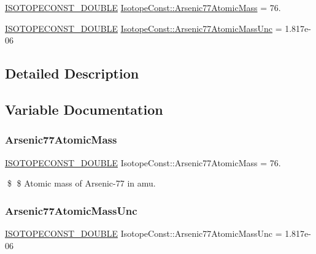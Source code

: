 \begin{DoxyCompactItemize}
\item 
\mbox{\hyperlink{group___isotope_const-_macros_ga8f45a7272ce02c0b4c65c44636ed719a}{I\+S\+O\+T\+O\+P\+E\+C\+O\+N\+S\+T\+\_\+\+D\+O\+U\+B\+LE}} \mbox{\hyperlink{group___isotope_const-_arsenic-_as77_ga30bb4168897cb4e903882e5d24861c7c}{Isotope\+Const\+::\+Arsenic77\+Atomic\+Mass}} = 76.
\item 
\mbox{\hyperlink{group___isotope_const-_macros_ga8f45a7272ce02c0b4c65c44636ed719a}{I\+S\+O\+T\+O\+P\+E\+C\+O\+N\+S\+T\+\_\+\+D\+O\+U\+B\+LE}} \mbox{\hyperlink{group___isotope_const-_arsenic-_as77_ga2c2886e88f5d90d0d79398e41da9450a}{Isotope\+Const\+::\+Arsenic77\+Atomic\+Mass\+Unc}} = 1.\+817e-\/06
\end{DoxyCompactItemize}


\subsection{Detailed Description}


\subsection{Variable Documentation}
\mbox{\label{group___isotope_const-_arsenic-_as77_ga30bb4168897cb4e903882e5d24861c7c}} 
\subsubsection{\texorpdfstring{Arsenic77\+Atomic\+Mass}{Arsenic77AtomicMass}}
{\footnotesize\ttfamily \mbox{\hyperlink{group___isotope_const-_macros_ga8f45a7272ce02c0b4c65c44636ed719a}{I\+S\+O\+T\+O\+P\+E\+C\+O\+N\+S\+T\+\_\+\+D\+O\+U\+B\+LE}} Isotope\+Const\+::\+Arsenic77\+Atomic\+Mass = 76.}

\$ \$ Atomic mass of Arsenic-\/77 in amu. \mbox{\label{group___isotope_const-_arsenic-_as77_ga2c2886e88f5d90d0d79398e41da9450a}} 
\subsubsection{\texorpdfstring{Arsenic77\+Atomic\+Mass\+Unc}{Arsenic77AtomicMassUnc}}
{\footnotesize\ttfamily \mbox{\hyperlink{group___isotope_const-_macros_ga8f45a7272ce02c0b4c65c44636ed719a}{I\+S\+O\+T\+O\+P\+E\+C\+O\+N\+S\+T\+\_\+\+D\+O\+U\+B\+LE}} Isotope\+Const\+::\+Arsenic77\+Atomic\+Mass\+Unc = 1.\+817e-\/06}

